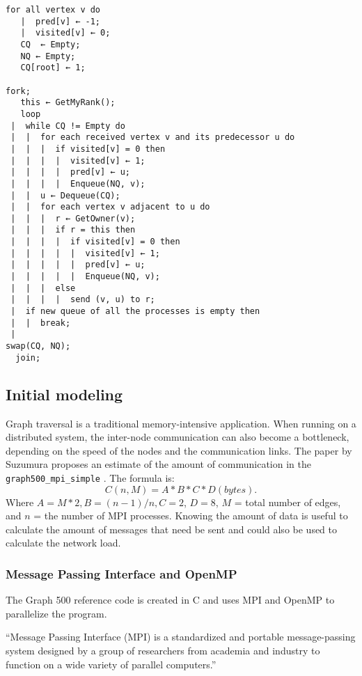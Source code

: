\begin{lstlisting}[label={code:pseudo-simple},caption={Pseudo code taken from paper \cite{suzumura2011performance}}]
for all vertex v do 
   |  pred[v] ← -1; 
   |  visited[v] ← 0; 
   CQ  ← Empty; 
   NQ ← Empty; 
   CQ[root] ← 1; 
   
fork;
   this ← GetMyRank(); 
   loop 
 |  while CQ != Empty do 
 |  |  for each received vertex v and its predecessor u do 
 |  |  |  if visited[v] = 0 then 
 |  |  |  |  visited[v] ← 1; 
 |  |  |  |  pred[v] ← u; 
 |  |  |  |  Enqueue(NQ, v); 
 |  |  u ← Dequeue(CQ); 
 |  |  for each vertex v adjacent to u do 
 |  |  |  r ← GetOwner(v); 
 |  |  |  if r = this then 
 |  |  |  |  if visited[v] = 0 then 
 |  |  |  |  |  visited[v] ← 1; 
 |  |  |  |  |  pred[v] ← u; 
 |  |  |  |  |  Enqueue(NQ, v); 
 |  |  |  else 
 |  |  |  |  send (v, u) to r; 
 |  if new queue of all the processes is empty then 
 |  |  break; 
 |  
swap(CQ, NQ); 
  join;
\end{lstlisting}
 

\subsection*{Initial modeling}
Graph traversal is a traditional memory-intensive application. When running on a distributed system, the inter-node communication can also become a bottleneck, depending on the speed of the nodes and the communication links. 
The paper by Suzumura \cite{suzumura2011performance} proposes an estimate of the amount of communication in the \texttt{graph500\_mpi\_simple} . The formula is:
\begin{equation}
\label{eq:communication_size}
C(n, M) = A * B * C * D (bytes).
\end{equation}
Where $A = M*2, B = (n-1)/n, C=2$, $D=8$, $M$ = total number of edges, and $n$ = the number of MPI processes.
Knowing the amount of data is useful to calculate the amount of messages that need be sent and could also be used to calculate the network load.

\subsubsection{Message Passing Interface and OpenMP}
\label{mpiopenmp}
The Graph 500 reference code is created in C and uses MPI and OpenMP to parallelize the program.

``Message Passing Interface (MPI) is a standardized and portable message-passing system designed by a group of researchers from academia and industry to function on a wide variety of parallel computers.\cite{mpi}''

